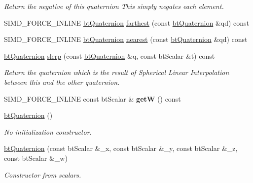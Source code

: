 \begin{DoxyCompactItemize}
\begin{DoxyCompactList}\small\item\em Return the negative of this quaternion This simply negates each element. \end{DoxyCompactList}\item 
S\+I\+M\+D\+\_\+\+F\+O\+R\+C\+E\+\_\+\+I\+N\+L\+I\+NE \hyperlink{classbtQuaternion}{bt\+Quaternion} \hyperlink{classbtQuaternion_a4c5ce0652f1cff12d1981c49b43483f1}{farthest} (const \hyperlink{classbtQuaternion}{bt\+Quaternion} \&qd) const
\item 
S\+I\+M\+D\+\_\+\+F\+O\+R\+C\+E\+\_\+\+I\+N\+L\+I\+NE \hyperlink{classbtQuaternion}{bt\+Quaternion} \hyperlink{classbtQuaternion_aba0984f947a7ad85a023e2b24ffc4db1}{nearest} (const \hyperlink{classbtQuaternion}{bt\+Quaternion} \&qd) const
\item 
\hyperlink{classbtQuaternion}{bt\+Quaternion} \hyperlink{classbtQuaternion_a0b34cbf669afb05d0618ff100a76b0dc}{slerp} (const \hyperlink{classbtQuaternion}{bt\+Quaternion} \&q, const bt\+Scalar \&t) const
\begin{DoxyCompactList}\small\item\em Return the quaternion which is the result of Spherical Linear Interpolation between this and the other quaternion. \end{DoxyCompactList}\item 
\mbox{\label{classbtQuaternion_a3d072cde7db77cb3a100f99999950297}} 
S\+I\+M\+D\+\_\+\+F\+O\+R\+C\+E\+\_\+\+I\+N\+L\+I\+NE const bt\+Scalar \& {\bfseries getW} () const
\item 
\mbox{\label{classbtQuaternion_a3b5e50d610ee8cdda2aa78e092825675}} 
\hyperlink{classbtQuaternion_a3b5e50d610ee8cdda2aa78e092825675}{bt\+Quaternion} ()
\begin{DoxyCompactList}\small\item\em No initialization constructor. \end{DoxyCompactList}\item 
\mbox{\label{classbtQuaternion_a6a50bf861ae5fa4ad5ea2b7da231847c}} 
\hyperlink{classbtQuaternion_a6a50bf861ae5fa4ad5ea2b7da231847c}{bt\+Quaternion} (const bt\+Scalar \&\+\_\+x, const bt\+Scalar \&\+\_\+y, const bt\+Scalar \&\+\_\+z, const bt\+Scalar \&\+\_\+w)
\begin{DoxyCompactList}\small\item\em Constructor from scalars. \end{DoxyCompactList}\item 

\end{DoxyCompactItemize}
